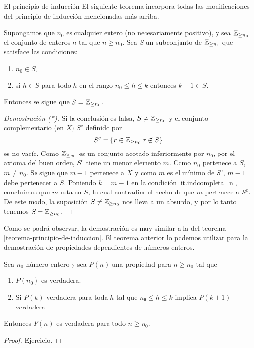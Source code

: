\begin{section}{El principio de inducción}
El siguiente teorema incorpora todas las modificaciones del principio de inducción mencionadas más arriba.

\begin{teorema} Supongamos que $n_0$ es cualquier entero (no necesariamente positivo), y sea ${\mathbb Z}_{\ge n_0}$ el conjunto de enteros $n$ tal que $ n \ge n_0$. Sea $S$ un subconjunto de  ${\mathbb Z}_{\ge n_0}$ que satisface las condiciones: 
\begin{enumerate}[label=\textit{\alph*)}]
\item\label{it.indcompleta_1} $n_0 \in S$,
\item\label{it.indcompleta_n} si $h\in S$ para todo $h$ en el rango $n_0 \le h \le k$ entonces $k+1 \in S$.
\end{enumerate}
Entonces se sigue que $S= {\mathbb Z}_{\ge n_0}$.
\end{teorema}
\begin{proof}[Demostración (*)]
Si la conclusión es falsa, $S \not=  {\mathbb Z}_{\ge n_0}$ y el conjunto complementario (en $X$)  $S^{\text{c}}$ definido por
$$
S^{\text{c}}= \{ r \in  {\mathbb Z}_{\ge n_0} | r\not\in S\}
$$
es no vacío. Como $ {\mathbb Z}_{\ge n_0}$ es un conjunto acotado inferiormente por $n_0$, por el axioma del buen orden, $S^{\text{c}}$ tiene un menor elemento $m$. Como $n_0$ pertenece a $S$, $m\not=n_0$. Se sigue que $m-1$ pertenece a $X$ y como $m$ es el mínimo de $S^{\text{c}}$, $m-1$ debe pertenecer a $S$. Poniendo $k=m-1$ en la condición \ref{it.indcompleta_n}, concluimos que $m$ esta en $S$, lo cual contradice el hecho de que $m$ pertenece a $S^{\text{c}}$. De este modo, la suposición $S \not=  {\mathbb Z}_{\ge n_0}$ nos lleva a un absurdo, y por lo tanto tenemos $S=  {\mathbb Z}_{\ge n_0}$.
\end{proof}

Como se podrá observar, la demostración es muy similar a  la del teorema \ref{teorema-principio-de-induccion}. El teorema anterior lo podemos utilizar para la demostración de propiedades dependientes de números enteros.

\begin{teorema}\label{ind-completa} Sea $n_0$ número entero y sea $P(n)$ una propiedad para $n \ge n_0$ tal que:
\begin{enumerate}[label=\textit{\alph*)}]
\item $P(n_0)$ es verdadera.
\item Si $P(h)$ verdadera para toda $h$ tal que $n_0 \le h \le k$ implica $P(k + 1)$ verdadera.
\end{enumerate}
Entonces $P(n)$ es verdadera para todo $n \ge n_0$.
\end{teorema}
\begin{proof} Ejercicio.
\end{proof}




\end{section}
